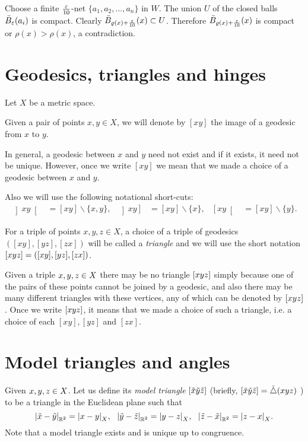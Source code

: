 Choose a finite $\tfrac\eps{10}$-net $\{a_1,a_2,\dots,a_n\}$ in $W$.
The union $U$ of the closed balls $\bar B_\eps(a_i)$ is compact.
Clearly $\bar B_{\rho(x)+\frac\eps{10}}(x)\subset U$.
Therefore $\bar B_{\rho(x)+\frac\eps{10}}(x)$ is compact
or $\rho(x)>\rho(x)$, 
a contradiction.\qeds

\section{Geodesics, triangles and hinges}

Let $X$ be a metric space.

Given a pair of points $x,y\in X$,
we will denote by $[xy]$ the image of a geodesic from $x$ to $y$. 

In general, a geodesic between $x$ and $y$ need not exist and if it exists, it need not be unique.  However,  once we write $[x y]$ we mean that we made a choice of a geodesic between $x$ and $y$.

Also we will use the following notational short-cuts:
\begin{align*}
\left] x y \right[&=[xy]\backslash\{x,y\},
&
\left] x y \right]&=[xy]\backslash\{x\},
&
\left[ x y \right[&=[xy]\backslash\{y\}.
\end{align*}

For a triple of points $x,y,z\in X$, 
a choice of a triple of geodesics $([x y], [y z], [z x])$ will be called a \emph{triangle} and we will use the short notation 
$\trig x y z \z=([x y], [y z], [z x])$.

Given a triple $x,y,z\in \spc{X}$ there may be no triangle 
$\trig x y z$ simply because one of the pairs of these points cannot be joined by a geodesic, and also there may be many different triangles with these vertices, any of which can be denoted by $\trig x y z$.
Once we write $\trig x y z$, it means that we made a choice of such a triangle, 
i.e. a choice of each $[x y], [y z]$ and $[z x]$.

\section{Model triangles and angles}

Given 
$x,y,z\in \spc{X}$. 
Let us define its \emph{model triangle} $\trig{\tilde x}{\tilde y}{\tilde z}$ 
(briefly, 
$\trig{\tilde x}{\tilde y}{\tilde z}=\modtrig0(x y z)$%
) to be a triangle in the Euclidean plane  such that
\[\dist{\tilde x}{\tilde y}{\RR^2}=\dist{x}{y}{X},
\ \ \dist{\tilde y}{\tilde z}{\RR^2}=\dist{y}{z}{X},
\ \ \dist{\tilde z}{\tilde x}{\RR^2}=\dist{z}{x}{X}.\]
Note that a model triangle exists and is unique up to congruence.

